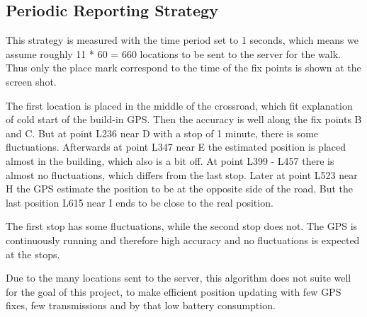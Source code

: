 \subsection{Periodic Reporting Strategy}
This strategy is measured with the time period set to 1 seconds, which means we assume roughly 11 * 60 = 660 locations to be sent to the server for the walk. Thus only the place mark correspond to the time of the fix points is shown at the screen shot. 

The first location is placed in the middle of the crossroad, which fit explanation of cold start of the build-in GPS. Then the accuracy is well along the fix points B and C. But at point L236 near D with a stop of 1 minute, there is some fluctuations. Afterwards at point L347 near E the estimated position is placed almost in the building, which also is a bit off. At point L399 - L457 there is almost no fluctuations, which differs from the last stop. Later at point L523 near H the GPS estimate the position to be at the opposite side of the road. But the last position L615 near I ends to be close to the real position.

The first stop has some fluctuations, while the second stop does not. The GPS is continuously running and therefore high accuracy and no fluctuations is expected at the stops.

Due to the many locations sent to the server, this algorithm does not suite well for the goal of this project, to make efficient position updating with few GPS fixes, few transmissions and by that low battery consumption.